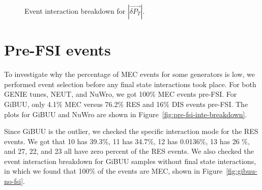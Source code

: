 \documentclass{article}
\newcommand{\vdp}{\vec{\delta P_T}}
\begin{document}
\begin{figure}
    \centering
    \caption{Event interaction breakdown for $|\vdp|$.}
    \label{fig:inte-breakdown-dpt}
\end{figure}

\section{Pre-FSI events}

To investigate why the percentage of MEC events for some generators is low, we performed event selection before any final state interactions took place. For both GENIE tunes, NEUT, and NuWro, we got 100\% MEC events pre-FSI. For GiBUU, only 4.1\% MEC versus 76.2\% RES and 16\% DIS events pre-FSI. The plots for GiBUU and NuWro are shown in Figure~\ref{fig:pre-fsi-inte-breakdown}. 

Since GiBUU is the outlier, we checked the specific interaction mode for the RES events. We got that 10 has 39.3\%, 11 has 34.7\%, 12 has 0.0136\%, 13 has 26 \%, and 27, 22, and 23 all have zero percent of the RES events. We also checked the event interaction breakdown for GiBUU samples without final state interactions, in which we found that 100\% of the events are MEC, shown in Figure~\ref{fig:gibuu-no-fsi}.
\end{document}
